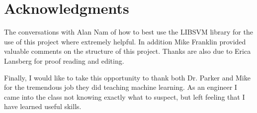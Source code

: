 \section*{Acknowledgments}
The conversations with Alan Nam of how to best use the LIBSVM library for the use of this project where extremely helpful.
In addition Mike Franklin provided valuable comments on the structure of this project.
Thanks are also due to Erica Lansberg for proof reading and editing.

Finally, I would like to take this opportunity to thank both Dr. Parker and Mike for the tremendous job they did teaching machine learning.
As an engineer I came into the class not knowing exactly what to suspect, but left feeling that I have learned useful skills.


